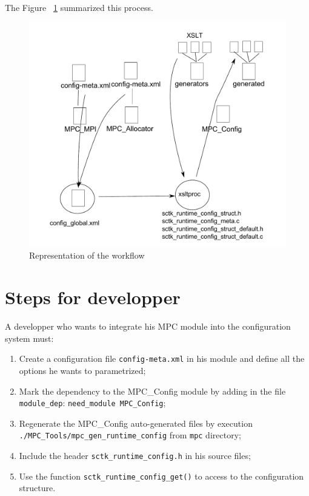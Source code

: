 \documentclass{article}
\begin{document}
\noindent The Figure ~\ref{fig:conf_workflow_conf} summarized this process.

\begin{figure}[htc!]
\includegraphics[scale=0.8]{file-workflow.pdf}
\caption{Representation of the workflow}
\label{fig:conf_workflow_conf}
\end{figure}

\section {Steps for developper}

A developper who wants to integrate his MPC module into the configuration system must:
\begin{enumerate}
\item Create a configuration file \texttt{config-meta.xml} in his module and define all the options he wants to parametrized;
\item Mark the dependency to the MPC\_Config module by adding in the file \texttt{module\_dep}: \texttt{need\_module MPC\_Config};
\item Regenerate the MPC\_Config auto-generated files by execution \texttt{./MPC\_Tools/mpc\_gen\_runtime\_config} from \texttt{mpc} directory;
\item Include the header \texttt{sctk\_runtime\_config.h} in his source files;
\item Use the function \texttt{sctk\_runtime\_config\_get()} to access to the configuration structure.
\end{enumerate}
\end{document}

